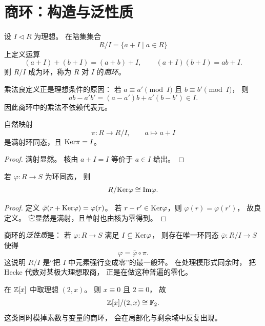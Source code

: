 \section{商环：构造与泛性质}
\begin{definition}
设 $I\triangleleft R$ 为理想。 在陪集集合
\[
R/I=\{a+I\mid a\in R\}
\]
上定义运算
\[
(a+I)+(b+I)=(a+b)+I,
\qquad
(a+I)(b+I)=ab+I.
\]
则 $R/I$ 成为环，称为 $R$ 对 $I$ 的\emph{商环}。
\end{definition}
乘法良定义正是理想条件的原因： 若 $a\equiv a'\pmod I$ 且 $b\equiv b'\pmod I$， 则
\[
ab-a'b'=(a-a')b+a'(b-b')\in I.
\]
因此商环中的乘法不依赖代表元。
\begin{proposition}
自然映射
\[
\pi:R\to R/I,
\qquad a\mapsto a+I
\]
是满射环同态，且 $\mathrm{Ker}\pi=I$。
\end{proposition}
\begin{proof}
满射显然。 核由 $a+I=I$ 等价于 $a\in I$ 给出。
\end{proof}
\begin{theorem}[第一同构定理]
若 $\varphi:R\to S$ 为环同态， 则
\[
R/\mathrm{Ker}\varphi\cong \mathrm{Im}\varphi.
\]
\end{theorem}
\begin{proof}
定义 $\bar\varphi(r+\mathrm{Ker}\varphi)=\varphi(r)$。 若 $r-r'\in\mathrm{Ker}\varphi$，则 $\varphi(r)=\varphi(r')$， 故良定义。 它显然是满射，且单射也由核为零得到。
\end{proof}
\begin{remark}
商环的\emph{泛性质}是： 若 $\varphi:R\to S$ 满足 $I\subseteq\mathrm{Ker}\varphi$， 则存在唯一环同态 $\bar\varphi:R/I\to S$ 使得
\[
\varphi=\bar\varphi\circ \pi.
\]
这说明 $R/I$ 是“把 $I$ 中元素强行变成零”的最一般环。 在处理模形式同余时， 把 Hecke 代数对某极大理想取商， 正是在做这种普遍的零化。
\end{remark}
\begin{example}
在 $\mathbb{Z}[x]$ 中取理想 $(2,x)$。 则 $x\equiv 0$ 且 $2\equiv 0$， 故
\[
\mathbb{Z}[x]/(2,x)\cong \mathbb{F}_2.
\]
这类同时模掉素数与变量的商环， 会在局部化与剩余域中反复出现。
\end{example}

